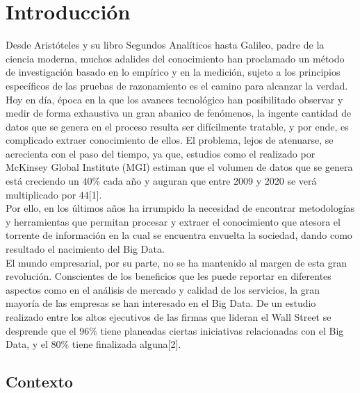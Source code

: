 
\pagestyle{fancy}

\chapter{Introducción}
\label{introduccion}

Desde Aristóteles y su libro Segundos Analíticos hasta Galileo, padre de la ciencia moderna, muchos adalides del conocimiento han proclamado un método de investigación basado en lo empírico y en la medición, sujeto a los principios específicos de las pruebas de razonamiento es el camino para alcanzar la verdad.\\

Hoy en día, época en la que los avances tecnológico han posibilitado observar y medir de forma exhaustiva un gran abanico de fenómenos, la ingente cantidad de datos que se genera en el proceso resulta ser difícilmente tratable, y por ende, es complicado extraer conocimiento de ellos. El problema, lejos de atenuarse, se acrecienta con el paso del tiempo, ya que, estudios como el realizado por McKinsey Global Institute (MGI) estiman que el volumen de datos que se genera está creciendo un 40\% cada año y auguran  que entre 2009 y 2020 se verá multiplicado por 44[1].\\

Por ello, en los últimos años ha irrumpido la necesidad de encontrar metodologías y herramientas que permitan procesar y extraer el conocimiento que atesora el torrente de información en la cual se encuentra envuelta la sociedad, dando como resultado el nacimiento del Big Data.\\

El mundo empresarial, por su parte, no se ha mantenido al margen de esta gran revolución. Conscientes de los beneficios que les puede reportar en diferentes aspectos como en el análisis de mercado y calidad de los servicios, la gran mayoría de las empresas se han interesado en el Big Data. De un estudio realizado entre los altos ejecutivos de las firmas que lideran el Wall Street se desprende que el 96\% tiene planeadas ciertas iniciativas relacionadas con el Big Data, y el 80\% tiene finalizada alguna[2].

\section{Contexto}

